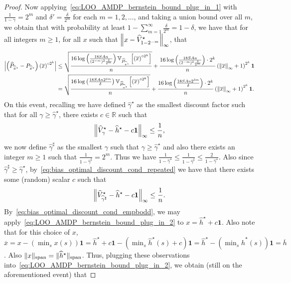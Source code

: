 \documentclass{article}
\theoremstyle{plain}
\theoremstyle{plain}
\theoremstyle{remark}
\theoremstyle{plain}
\theoremstyle{plain}
\newcommand{\R}{\mathbb{R}}
\newcommand{\Var}{\mathbb{V}}
\newcommand{\Phat}{\widehat{P}}
\newcommand{\Vhat}{\widehat{V}}
\newcommand{\pihstar}{\widehat{\pi}^\star}
\newcommand{\one}{\mathbf{1}}
\newcommand{\hc}{\overline{h}}
\newcommand{\hhat}{\widehat{h}}
\newcommand{\empbod}{\widehat{\gamma}^\star}
\newcommand{\empbodd}{\widehat{\gamma}^{\sharp}}
\newcommand{\ox}{\overline{x}}
\begin{document}
\begin{proof}
    Now applying~\eqref{eq:LOO_AMDP_bernstein_bound_plug_in_1} with $\frac{1}{1-\gamma} = 2^m$ and $\delta' = \frac{\delta}{2^m}$ for each $m = 1, 2, \dots$, and taking a union bound over all $m$, we obtain that with probability at least $1 - \sum_{m=1}^\infty \frac{\delta}{2^m} = 1 - \delta$, we have that for all integers $m \geq 1$, for all $x$ such that $\infnorm{x - \Vhat^\star_{1-2^{-m}}}$, that
    \begin{align}
        \left| \left(\Phat_{\pihstar} - P_{\pihstar}\right) \left( \ox \right)^{\circ 2^k} \right|
    &\leq \sqrt{\frac{16 \log \left(\frac{18 SA n}{(2^{-m})^2 \frac{\delta}{2^m}} \right)   \Var_{\Phat_{\pihstar}} \left[ \left(\ox \right)^{\circ 2^k}  \right]    }{n }} + \frac{ 16 \log \left(\frac{18 SA n}{(2^{-m})^2 \frac{\delta}{2^m}} \right)  \cdot 2^k }{n}  \left( \infnorm{\ox} + 1\right)^{2^k}   \one \nonumber \\
    &= \sqrt{\frac{16 \log \left(\frac{18 SA n 2^{3m}}{ \delta} \right)   \Var_{\Phat_{\pihstar}} \left[ \left(\ox \right)^{\circ 2^k}  \right]    }{n }} + \frac{ 16 \log \left(\frac{18 SA n 2^{3m}}{ \delta} \right)  \cdot 2^k }{n}  \left( \infnorm{\ox} + 1\right)^{2^k}   \one .\label{eq:LOO_AMDP_bernstein_bound_plug_in_2}
    \end{align}
    On this event, recalling we have defined $\empbod$ as the smallest discount factor such that for all $\gamma \geq \empbod$, there exists $c \in \R$ such that
    \begin{align}
        \infnorm{\Vhat_\gamma^\star - \hhat^\star - c \one} \leq \frac{1}{n}, \label{eq:bias_optimal_discount_cond_repeated}
    \end{align}
    we now define $\empbodd$ as the smallest $\gamma$ such that $\gamma \geq \empbod$ and also there exists an integer $m \geq 1$ such that $\frac{1}{1-\empbodd} = 2^m$. Thus we have $\frac{1}{1-\empbod} \leq \frac{1}{1-\empbodd} \leq \frac{2}{1-\empbod}$. Also since $\empbodd \geq \empbod$, by~\eqref{eq:bias_optimal_discount_cond_repeated} we have that there exists some (random) scalar $c$ such that
    \begin{align}
        \infnorm{\Vhat_{\empbodd}^\star - \hhat^\star - c \one} \leq \frac{1}{n}. \label{eq:bias_optimal_discount_cond_empbodd}
    \end{align}
    By~\eqref{eq:bias_optimal_discount_cond_empbodd}, we may apply~\eqref{eq:LOO_AMDP_bernstein_bound_plug_in_2} to $x = \hhat^\star + c \one$. Also note that for this choice of $x$, $\ox = x - ( \min_s x(s))\one = \hhat^\star + c \one - ( \min_s \hhat^\star(s) + c)\one =\hhat^\star -  ( \min_s \hhat^\star(s) )\one = \hc$. Also $\spannorm{x} = \spannorm{\hhat^\star}$. Thus, plugging these observations into~\eqref{eq:LOO_AMDP_bernstein_bound_plug_in_2}, we obtain (still on the aforementioned event) that

\end{proof}
\end{document}
